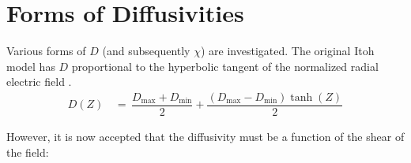 \section{Forms of Diffusivities}\label{sec:diffusivities}
Various forms of $D$ (and subsequently $\chi$) are investigated.
The original Itoh model has $D$ proportional to the hyperbolic tangent of the normalized radial electric field \cite{itoh_edge_1991} \cite{zohm_dynamic_1994}.
\begin{align} %
	D(Z) \,&=\, \dfrac{D_\text{max} + D_\text{min}}{2} + \dfrac{(D_\text{max} - D_\text{min})\tanh(Z)}{2} \label{eq:Itoh_diffusivity}
\end{align}

However, it is now accepted that the diffusivity must be a function of the shear of the field:

